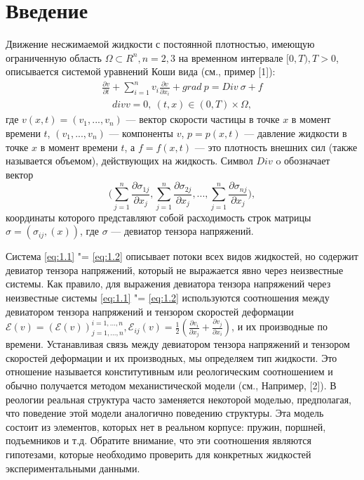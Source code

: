 \section{Введение}

Движение несжимаемой жидкости с постоянной плотностью, имеющую ограниченную область $\Omega\subset R^n, n=2,3$ на временном интервале 
$[0,T), T>0$, описывается системой уравнений Коши вида (см., пример [1]):
\begin{equation}\label{eq:1.1}
    \begin{gathered}
        \frac{\partial v}{\partial t}+\sum_{i=1}^n v_i\frac{\partial v}{\partial x_i}+ grad \ p=Div \ \sigma + f
    \end{gathered}
\end{equation}
\begin{equation}\label{eq:1.2}
    \begin{gathered}
        div v=0, \ (t,x)\in (0,T)\times\Omega,
    \end{gathered}
\end{equation}
где $v (x, t) = (v_1,...,v_n)$ --- вектор скорости частицы в точке $x$ в момент времени $t$, $(v_1,...,v_n)$ --- компоненты $v$,
$p = p (x, t)$ --- давление жидкости в точке $x$ в момент времени $t$, а $f = f (x, t)$ --- это плотность внешних сил 
(также называется объемом), действующих на жидкость. Символ $Div$ o обозначает вектор
$$\bigg(\sum_{j=1}^n\frac{\partial\sigma_{1j}}{\partial x_j},\sum_{j=1}^n\frac{\partial\sigma_{2j}}{\partial x_j},...,\sum_{j=1}^n\frac{\partial\sigma_{nj}}{\partial x_j}\bigg),$$
координаты которого представляют собой расходимость строк матрицы $\sigma = (\sigma_{ij}, (x))$, где $\sigma$ --- девиатор 
тензора напряжений.

Система \ref{eq:1.1} "= \ref{eq:1.2} описывает потоки всех видов жидкостей, но содержит девиатор тензора напряжений, 
который не выражается явно через неизвестные системы. Как правило, для выражения девиатора тензора напряжений через 
неизвестные системы \ref{eq:1.1} "= \ref{eq:1.2} используются соотношения между девиатором тензора напряжений и тензором 
скоростей деформации $\mathcal{E}(v)=(\mathcal{E}(v))^{i=1,...,n}_{j=1,...,n},\mathcal{E}_{ij}(v)=\frac{1}{2}(\frac{\partial v_i}{\partial x_j}+\frac{\partial v_j}{\partial x_i})$, 
и их производные по времени. Устанавливая связь между девиатором тензора напряжений и тензором скоростей деформации и их 
производных, мы определяем тип жидкости. Это отношение называется конститутивным или реологическим соотношением и обычно 
получается методом механистической модели (см., Например, [2]). В реологии реальная структура часто заменяется некоторой 
моделью, предполагая, что поведение этой модели аналогично поведению структуры.  Эта модель состоит из элементов, которых 
нет в реальном корпусе: пружин, поршней, подъемников и т.д. Обратите внимание, что эти соотношения являются гипотезами, 
которые необходимо проверить для конкретных жидкостей экспериментальными данными. 

